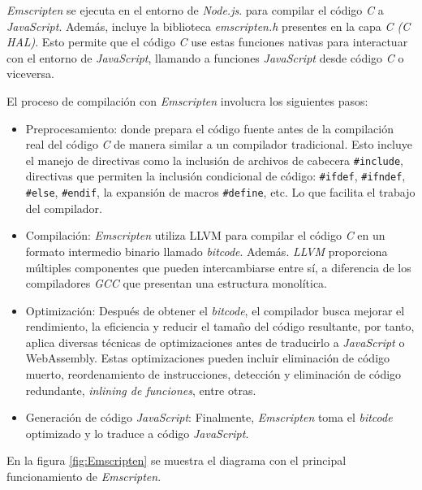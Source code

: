 \textit{Emscripten} se ejecuta en el entorno de \textit{Node.js}. para compilar el código \textit{C} a \textit{JavaScript}. Además, incluye la biblioteca \textit{emscripten.h} presentes en la capa \textit{C (C HAL)}. Esto permite que el código \textit{C} use estas funciones nativas para interactuar con el entorno de \textit{JavaScript}, llamando a funciones \textit{JavaScript} desde código \textit{C} o viceversa.

El proceso de compilación con \textit{Emscripten} involucra los siguientes pasos:

\begin{itemize}
	\item Preprocesamiento: donde prepara el código fuente antes de la compilación real del código \textit{C} de manera similar a un compilador tradicional. Esto incluye el manejo de directivas como la inclusión de archivos de cabecera \texttt{\#include}, directivas que permiten la inclusión condicional de código: \newline \texttt{\#ifdef}, \texttt{\#ifndef}, \texttt{\#else}, \texttt{\#endif}, la expansión de macros \texttt{\#define}, etc. Lo que facilita el trabajo del compilador.
	
	\item Compilación: \textit{Emscripten} utiliza LLVM para compilar el código \textit{C} en un formato intermedio binario llamado  \textit{bitcode}. 
Además. \textit{LLVM} proporciona múltiples componentes que pueden intercambiarse entre sí, a diferencia de los compiladores \textit{GCC} que presentan una estructura monolítica. 

	\item Optimización: Después de obtener el \textit{bitcode}, el compilador busca mejorar el rendimiento, la eficiencia y reducir el tamaño del código resultante, por tanto,  aplica diversas técnicas de optimizaciones antes de traducirlo a \textit{JavaScript} o WebAssembly. Estas optimizaciones pueden incluir eliminación de código muerto, reordenamiento de instrucciones, detección y eliminación de código redundante, \textit{inlining de funciones}, entre otras.
	
	\item Generación de código \textit{JavaScript}: Finalmente, \textit{Emscripten} toma el \textit{bitcode} optimizado y lo traduce a código \textit{JavaScript}.

\end{itemize}

En la figura \ref{fig:Emscripten} se muestra el diagrama con el principal funcionamiento de \textit{Emscripten}. 

